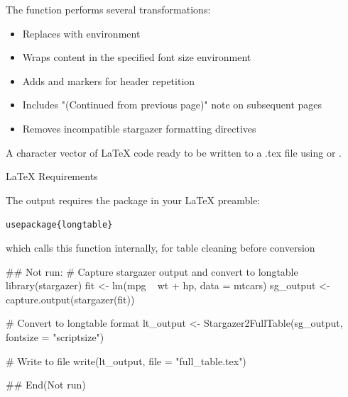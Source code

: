\documentclass[a4paper]{book}
\begin{document}
%
\begin{Details}
The function performs several transformations:
\begin{itemize}

\item{} Replaces  with  environment
\item{} Wraps content in the specified font size environment
\item{} Adds  and  markers for header
repetition
\item{} Includes "(Continued from previous page)" note on subsequent pages
\item{} Removes incompatible stargazer formatting directives

\end{itemize}

\end{Details}
%
\begin{Value}
A character vector of LaTeX code ready to be written to a .tex file
using  or .
\end{Value}
%
\begin{Section}{LaTeX Requirements}

The output requires the  package in your LaTeX preamble:
\begin{alltt}\bsl{}usepackage\{longtable\}\end{alltt}

\end{Section}
%
\begin{SeeAlso}
 which calls this function internally,
 for table cleaning before conversion
\end{SeeAlso}
%
\begin{Examples}
\begin{ExampleCode}
## Not run: 
# Capture stargazer output and convert to longtable
library(stargazer)
fit <- lm(mpg ~ wt + hp, data = mtcars)
sg_output <- capture.output(stargazer(fit))

# Convert to longtable format
lt_output <- Stargazer2FullTable(sg_output, fontsize = "scriptsize")

# Write to file
write(lt_output, file = "full_table.tex")

## End(Not run)

\end{ExampleCode}
\end{Examples}
\end{document}
